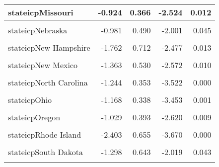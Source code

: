 \documentclass[
]{article}
\begin{document}
\begin{table}
\begin{tabular}[t]{l|r|r|r|r}
\hline
stateicpMissouri & -0.924 & 0.366 & -2.524 & 0.012\\
\hline
\cellcolor{gray!6}{stateicpMontana} & \cellcolor{gray!6}{-0.720} & \cellcolor{gray!6}{0.731} & \cellcolor{gray!6}{-0.986} & \cellcolor{gray!6}{0.324}\\
\hline
stateicpNebraska & -0.981 & 0.490 & -2.001 & 0.045\\
\hline
\cellcolor{gray!6}{stateicpNevada} & \cellcolor{gray!6}{-1.711} & \cellcolor{gray!6}{0.426} & \cellcolor{gray!6}{-4.017} & \cellcolor{gray!6}{0.000}\\
\hline
stateicpNew Hampshire & -1.762 & 0.712 & -2.477 & 0.013\\
\hline
\cellcolor{gray!6}{stateicpNew Jersey} & \cellcolor{gray!6}{-1.657} & \cellcolor{gray!6}{0.361} & \cellcolor{gray!6}{-4.584} & \cellcolor{gray!6}{0.000}\\
\hline
stateicpNew Mexico & -1.363 & 0.530 & -2.572 & 0.010\\
\hline
\cellcolor{gray!6}{stateicpNew York} & \cellcolor{gray!6}{-1.520} & \cellcolor{gray!6}{0.331} & \cellcolor{gray!6}{-4.598} & \cellcolor{gray!6}{0.000}\\
\hline
stateicpNorth Carolina & -1.244 & 0.353 & -3.522 & 0.000\\
\hline
\cellcolor{gray!6}{stateicpNorth Dakota} & \cellcolor{gray!6}{-0.241} & \cellcolor{gray!6}{0.760} & \cellcolor{gray!6}{-0.317} & \cellcolor{gray!6}{0.751}\\
\hline
stateicpOhio & -1.168 & 0.338 & -3.453 & 0.001\\
\hline
\cellcolor{gray!6}{stateicpOklahoma} & \cellcolor{gray!6}{-0.479} & \cellcolor{gray!6}{0.437} & \cellcolor{gray!6}{-1.096} & \cellcolor{gray!6}{0.273}\\
\hline
stateicpOregon & -1.029 & 0.393 & -2.620 & 0.009\\
\hline
\cellcolor{gray!6}{stateicpPennsylvania} & \cellcolor{gray!6}{-1.216} & \cellcolor{gray!6}{0.337} & \cellcolor{gray!6}{-3.609} & \cellcolor{gray!6}{0.000}\\
\hline
stateicpRhode Island & -2.403 & 0.655 & -3.670 & 0.000\\
\hline
\cellcolor{gray!6}{stateicpSouth Carolina} & \cellcolor{gray!6}{-0.614} & \cellcolor{gray!6}{0.379} & \cellcolor{gray!6}{-1.619} & \cellcolor{gray!6}{0.105}\\
\hline
stateicpSouth Dakota & -1.298 & 0.643 & -2.019 & 0.043\\
\hline
\cellcolor{gray!6}{stateicpTennessee} & \cellcolor{gray!6}{-0.678} & \cellcolor{gray!6}{0.375} & \cellcolor{gray!6}{-1.811} & \cellcolor{gray!6}{0.070}\\

\end{tabular}
\end{table}
\end{document}
